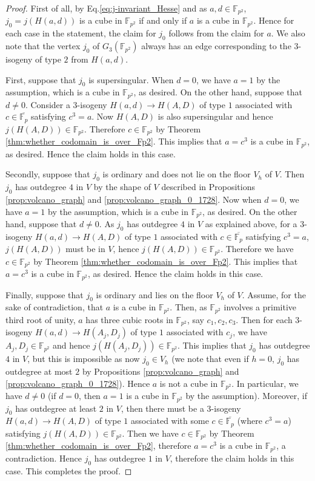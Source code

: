 \documentclass{article}
\theoremstyle{definition}
\newcommand{\FF}{\mathbb{F}}
\begin{document}
\begin{proof}
First of all, by Eq.\eqref{eq:j-invariant_Hesse} and as $a,d \in \FF_{p^2}$, $j_0 = j(H(a,d))$ is a cube in $\FF_{p^2}$ if and only if $a$ is a cube in $\FF_{p^2}$.
Hence for each case in the statement, the claim for $j_0$ follows from the claim for $a$.
We also note that the vertex $j_0$ of $G_3(\FF_{p^2})$ always has an edge corresponding to the $3$-isogeny of type $2$ from $H(a,d)$.

First, suppose that $j_0$ is supersingular.
When $d = 0$, we have $a = 1$ by the assumption, which is a cube in $\FF_{p^2}$, as desired.
On the other hand, suppose that $d \neq 0$.
Consider a $3$-isogeny $H(a,d) \to H(A,D)$ of type $1$ associated with $c \in \overline{\FF_p}$ satisfying $c^3 = a$.
Now $H(A,D)$ is also supersingular and hence $j(H(A,D)) \in \FF_{p^2}$.
Therefore $c \in \FF_{p^2}$ by Theorem \ref{thm:whether_codomain_is_over_Fp2}.
This implies that $a = c^3$ is a cube in $\FF_{p^2}$, as desired.
Hence the claim holds in this case.

Secondly, suppose that $j_0$ is ordinary and does not lie on the floor $V_h$ of $V$.
Then $j_0$ has outdegree $4$ in $V$ by the shape of $V$ described in Propositions \ref{prop:volcano_graph} and \ref{prop:volcano_graph_0_1728}.
Now when $d = 0$, we have $a = 1$ by the assumption, which is a cube in $\FF_{p^2}$, as desired.
On the other hand, suppose that $d \neq 0$.
As $j_0$ has outdegree $4$ in $V$ as explained above, for a $3$-isogeny $H(a,d) \to H(A,D)$ of type $1$ associated with $c \in \overline{\FF_p}$ satisfying $c^3 = a$, $j(H(A,D))$ must be in $V$, hence $j(H(A,D)) \in \FF_{p^2}$.
Therefore we have $c \in \FF_{p^2}$ by Theorem \ref{thm:whether_codomain_is_over_Fp2}.
This implies that $a = c^3$ is a cube in $\FF_{p^2}$, as desired.
Hence the claim holds in this case.

Finally, suppose that $j_0$ is ordinary and lies on the floor $V_h$ of $V$.
Assume, for the sake of contradiction, that $a$ is a cube in $\FF_{p^2}$.
Then, as $\FF_{p^2}$ involves a primitive third root of unity, $a$ has three cubic roots in $\FF_{p^2}$, say $c_1,c_2,c_3$.
Then for each $3$-isogeny $H(a,d) \to H(A_j,D_j)$ of type $1$ associated with $c_j$, we have $A_j,D_j \in \FF_{p^2}$ and hence $j(H(A_j,D_j)) \in \FF_{p^2}$.
This implies that $j_0$ has outdegree $4$ in $V$, but this is impossible as now $j_0 \in V_h$ (we note that even if $h = 0$, $j_0$ has outdegree at most $2$ by Propositions \ref{prop:volcano_graph} and \ref{prop:volcano_graph_0_1728}).
Hence $a$ is not a cube in $\FF_{p^2}$.
In particular, we have $d \neq 0$ (if $d = 0$, then $a = 1$ is a cube in $\FF_{p^2}$ by the assumption).
Moreover, if $j_0$ has outdegree at least $2$ in $V$, then there must be a $3$-isogeny $H(a,d) \to H(A,D)$ of type $1$ associated with some $c \in \overline{\FF_p}$ (where $c^3 = a$) satisfying $j(H(A,D)) \in \FF_{p^2}$.
Then we have $c \in \FF_{p^2}$ by Theorem \ref{thm:whether_codomain_is_over_Fp2}, therefore $a = c^3$ is a cube in $\FF_{p^2}$, a contradiction.
Hence $j_0$ has outdegree $1$ in $V$, therefore the claim holds in this case.
This completes the proof.
\end{proof}
\end{document}
